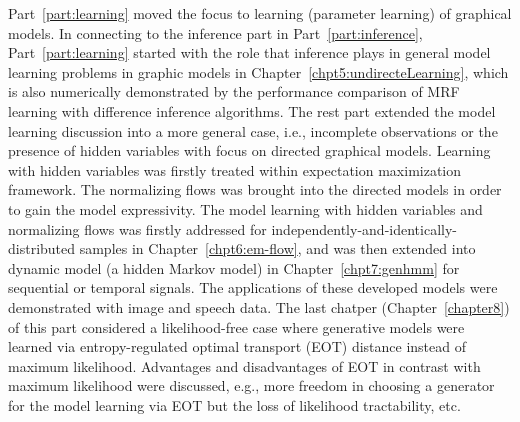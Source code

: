 Part~\ref{part:learning} moved the focus to learning (parameter learning) of graphical models. In connecting to the inference part in Part~\ref{part:inference}, Part~\ref{part:learning} started with the role that inference plays in general model learning problems in graphic models in Chapter~\ref{chpt5:undirecteLearning}, which is also numerically demonstrated by the performance comparison of MRF learning with difference inference algorithms. The rest part extended the model learning discussion into a more general case, i.e., incomplete observations or the presence of hidden variables with focus on directed graphical models. Learning with hidden variables was firstly treated within expectation maximization framework. The normalizing flows was brought into the directed models in order to gain the model expressivity. The model learning with hidden variables and normalizing flows was firstly addressed for independently-and-identically-distributed samples in Chapter~\ref{chpt6:em-flow}, and was then extended into dynamic model (a hidden Markov model) in Chapter~\ref{chpt7:genhmm} for sequential or temporal signals. The applications of these developed models were demonstrated with image and speech data. The last chatper (Chapter~\ref{chapter8}) of this part considered a likelihood-free case where generative models were learned via entropy-regulated optimal transport (EOT) distance instead of maximum likelihood. Advantages and disadvantages of EOT in contrast with maximum likelihood were discussed, e.g., more freedom in choosing a generator for the model learning via EOT but the loss of likelihood tractability, etc.

